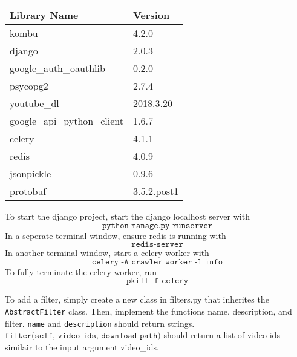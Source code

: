 \documentclass[11pt]{article}
\begin{document}
\begin{center}
\begin{tabular}{@{}|l|l|@{}}
\toprule
Library Name                & Version     \\ \midrule
kombu                       & 4.2.0       \\ \midrule
django                      & 2.0.3       \\ \midrule
google\_auth\_oauthlib      & 0.2.0       \\ \midrule
psycopg2                    & 2.7.4       \\ \midrule
youtube\_dl                 & 2018.3.20   \\ \midrule
google\_api\_python\_client & 1.6.7       \\ \midrule
celery                      & 4.1.1       \\ \midrule
redis                       & 4.0.9       \\ \midrule
jsonpickle                  & 0.9.6       \\ \midrule
protobuf                    & 3.5.2.post1 \\ \bottomrule
\end{tabular}
\end{center}
To start the django project, start the django localhost server with
$$\texttt{python manage.py runserver}$$
In a seperate terminal window, ensure redis is running with
$$\texttt{redis-server}$$
In another terminal window, start a celery worker with
$$\texttt{celery -A crawler worker -l info}$$
To fully terminate the celery worker, run
$$\texttt{pkill -f celery}$$

To add a filter, simply create a new class in filters.py that inherites the
\texttt{AbstractFilter} class. Then, implement the functions name, description,
and filter. \texttt{name} and \texttt{description} should return strings.
$\texttt{filter(self, video_ids, download_path)}$
should return a list of video ids
similair to the input argument video_ids.
\end{document}
